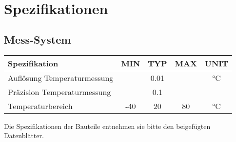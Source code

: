 \chapter{Spezifikationen}

\section{Mess-System}

\begin{tabular}{|l|c|c|c|c|}
\hline
\textbf{Spezifikation} & \textbf{MIN} & \textbf{TYP} & \textbf{MAX} & \textbf{UNIT} \\
\hline\hline
Auflösung Temperaturmessung &  & 0.01 & & °C\\
Präzision Temperaturmessung & & 0.1 & &\\
Temperaturbereich & -40 & 20 & 80 & °C\\
\hline
\end{tabular}

Die Spezifikationen der Bauteile entnehmen sie bitte den beigefügten
Datenblätter.
